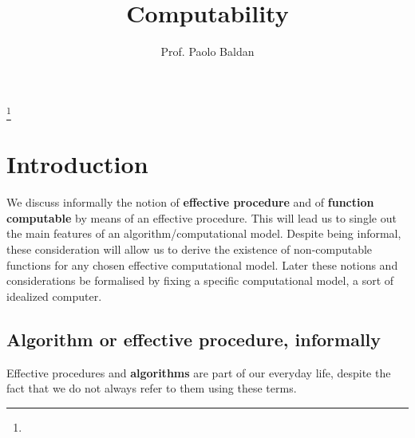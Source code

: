\documentclass{amsbook}
\theoremstyle{definition}
\theoremstyle{remark}
\numberwithin{section}{chapter}
\numberwithin{equation}{chapter}
\begin{document}
\frontmatter

\title{Computability}
  
\author{Prof. Paolo Baldan}
\address{}
\curraddr{}
\email{}
\thanks{}

\keywords{}

\date{}

\begin{abstract}
\end{abstract}

\maketitle


\setcounter{page}{4}

\tableofcontents


\mainmatter


\chapter{Introduction}

We discuss informally the notion of \textbf{effective procedure} and
of \textbf{function computable} by means of an effective
procedure. This will lead us to single out the main features of an
algorithm/computational model.  Despite being informal, these
consideration will allow us to derive the existence of non-computable
functions for any chosen effective computational model.
%
Later these notions and considerations be formalised by fixing a
specific computational model, a sort of idealized computer.

\section{Algorithm or effective procedure, informally}

Effective procedures and \textbf{algorithms} are part of our everyday
life, despite the fact that we do not always refer to them using these
terms.
\end{document}
